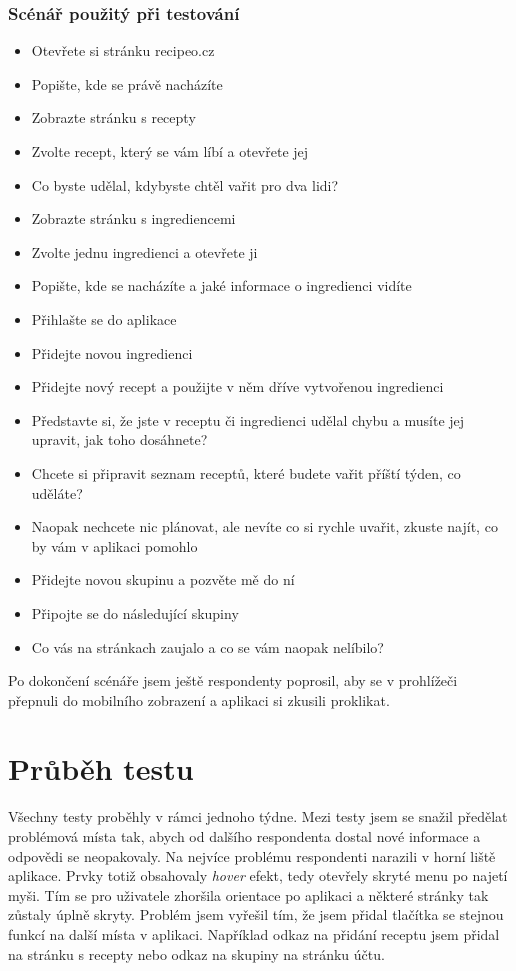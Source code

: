\subsubsection{Scénář použitý při testování}
\begin{itemize}
    \item Otevřete si stránku recipeo.cz
    \item Popište, kde se právě nacházíte
    \item Zobrazte stránku s recepty
    \item Zvolte recept, který se vám líbí a otevřete jej
    \item Co byste udělal, kdybyste chtěl vařit pro dva lidi?
    \item Zobrazte stránku s ingrediencemi
    \item Zvolte jednu ingredienci a otevřete ji
    \item Popište, kde se nacházíte a jaké informace o ingredienci vidíte
    \item Přihlašte se do aplikace
    \item Přidejte novou ingredienci
    \item Přidejte nový recept a použijte v něm dříve vytvořenou ingredienci
    \item Představte si, že jste v receptu či ingredienci udělal chybu a musíte jej upravit, jak toho dosáhnete?
    \item Chcete si připravit seznam receptů, které budete vařit příští týden, co uděláte?
    \item Naopak nechcete nic plánovat, ale nevíte co si rychle uvařit, zkuste najít, co by vám v aplikaci pomohlo
    \item Přidejte novou skupinu a pozvěte mě do ní
    \item Připojte se do následující skupiny
    \item Co vás na stránkach zaujalo a co se vám naopak nelíbilo?
\end{itemize}

Po dokončení scénáře jsem ještě respondenty poprosil, aby se v prohlížeči přepnuli do mobilního zobrazení a aplikaci si zkusili proklikat.

\section{Průběh testu}

Všechny testy proběhly v rámci jednoho týdne. Mezi testy jsem se snažil předělat problémová místa tak, abych od dalšího respondenta dostal
nové informace a odpovědi se neopakovaly. Na nejvíce problému respondenti narazili v horní liště aplikace. Prvky totiž obsahovaly \emph{hover}
efekt, tedy otevřely skryté menu po najetí myši. Tím se pro uživatele zhoršila orientace po aplikaci a některé stránky tak zůstaly úplně skryty.
Problém jsem vyřešil tím, že jsem přidal tlačítka se stejnou funkcí na další místa v aplikaci. Například odkaz na přidání receptu jsem přidal
na stránku s recepty nebo odkaz na skupiny na stránku účtu.

